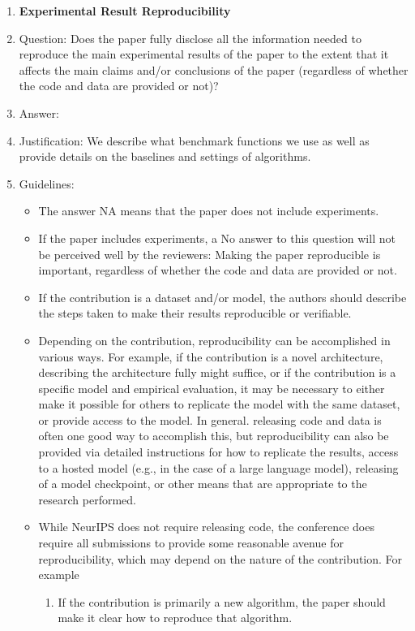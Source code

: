 \documentclass{article}
\theoremstyle{plain}
\theoremstyle{definition}
\theoremstyle{remark}
\theoremstyle{plain}
\begin{document}
\begin{enumerate}
    \item {\bf Experimental Result Reproducibility}
    \item[] Question: Does the paper fully disclose all the information needed to reproduce the main experimental results of the paper to the extent that it affects the main claims and/or conclusions of the paper (regardless of whether the code and data are provided or not)?
    \item[] Answer: \answerYes{} %
    \item[] Justification: We describe what benchmark functions we use as well as provide details on the baselines and settings of algorithms.
    \item[] Guidelines:
    \begin{itemize}
        \item The answer NA means that the paper does not include experiments.
        \item If the paper includes experiments, a No answer to this question will not be perceived well by the reviewers: Making the paper reproducible is important, regardless of whether the code and data are provided or not.
        \item If the contribution is a dataset and/or model, the authors should describe the steps taken to make their results reproducible or verifiable. 
        \item Depending on the contribution, reproducibility can be accomplished in various ways. For example, if the contribution is a novel architecture, describing the architecture fully might suffice, or if the contribution is a specific model and empirical evaluation, it may be necessary to either make it possible for others to replicate the model with the same dataset, or provide access to the model. In general. releasing code and data is often one good way to accomplish this, but reproducibility can also be provided via detailed instructions for how to replicate the results, access to a hosted model (e.g., in the case of a large language model), releasing of a model checkpoint, or other means that are appropriate to the research performed.
        \item While NeurIPS does not require releasing code, the conference does require all submissions to provide some reasonable avenue for reproducibility, which may depend on the nature of the contribution. For example
        \begin{enumerate}
            \item If the contribution is primarily a new algorithm, the paper should make it clear how to reproduce that algorithm.

\end{enumerate}
\end{itemize}
\end{enumerate}
\end{document}
